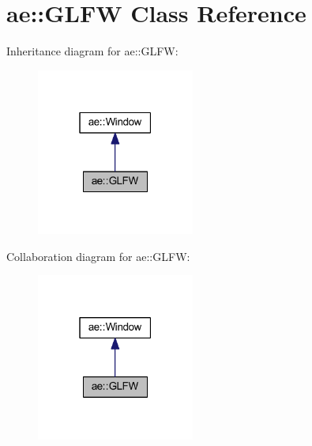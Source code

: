 \hypertarget{classae_1_1_g_l_f_w}{}\section{ae\+:\+:G\+L\+FW Class Reference}
\label{classae_1_1_g_l_f_w}


Inheritance diagram for ae\+:\+:G\+L\+FW\+:
\nopagebreak
\begin{figure}[H]
\begin{center}
\leavevmode
\includegraphics[width=147pt]{classae_1_1_g_l_f_w__inherit__graph}
\end{center}
\end{figure}


Collaboration diagram for ae\+:\+:G\+L\+FW\+:
\nopagebreak
\begin{figure}[H]
\begin{center}
\leavevmode
\includegraphics[width=147pt]{classae_1_1_g_l_f_w__coll__graph}
\end{center}
\end{figure}
